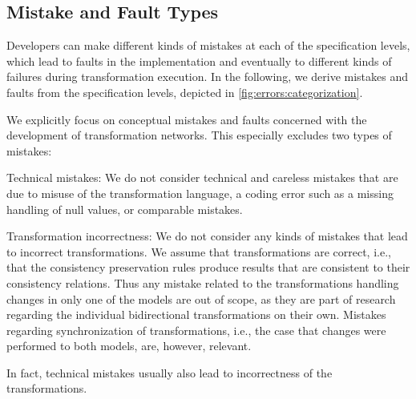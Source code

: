 \subsection{Mistake and Fault Types}
\label{chap:errors:categorization:mistakes}



Developers can make different kinds of mistakes at each of the specification levels, which lead to faults in the implementation and eventually to different kinds of failures during transformation execution.
In the following, we derive mistakes and faults from the specification levels, depicted in \autoref{fig:errors:categorization}.

We explicitly focus on conceptual mistakes and faults concerned with the development of transformation networks.
This especially excludes two types of mistakes:
\begin{properdescription}
    \item[Technical mistakes:] We do not consider technical and careless mistakes that are due to misuse of the transformation language, a coding error such as a missing handling of null values, or comparable mistakes.
    \item[Transformation incorrectness:] We do not consider any kinds of mistakes that lead to incorrect transformations. We assume that transformations are correct, i.e., that the consistency preservation rules produce results that are consistent to their consistency relations. Thus any mistake related to the transformations handling changes in only one of the models are out of scope, as they are part of research regarding the individual bidirectional transformations on their own. Mistakes regarding synchronization of transformations, i.e., the case that changes were performed to both models, are, however, relevant.
\end{properdescription}
In fact, technical mistakes usually also lead to incorrectness of the transformations.


